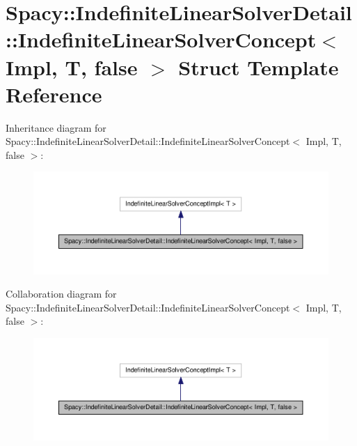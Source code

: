 \hypertarget{structSpacy_1_1IndefiniteLinearSolverDetail_1_1IndefiniteLinearSolverConcept_3_01Impl_00_01T_00_01false_01_4}{\section{\-Spacy\-:\-:\-Indefinite\-Linear\-Solver\-Detail\-:\-:\-Indefinite\-Linear\-Solver\-Concept$<$ \-Impl, \-T, false $>$ \-Struct \-Template \-Reference}
\label{structSpacy_1_1IndefiniteLinearSolverDetail_1_1IndefiniteLinearSolverConcept_3_01Impl_00_01T_00_01false_01_4}
}


\-Inheritance diagram for \-Spacy\-:\-:\-Indefinite\-Linear\-Solver\-Detail\-:\-:\-Indefinite\-Linear\-Solver\-Concept$<$ \-Impl, \-T, false $>$\-:
\nopagebreak
\begin{figure}[H]
\begin{center}
\leavevmode
\includegraphics[width=350pt]{structSpacy_1_1IndefiniteLinearSolverDetail_1_1IndefiniteLinearSolverConcept_3_01Impl_00_01T_00_01false_01_4__inherit__graph}
\end{center}
\end{figure}


\-Collaboration diagram for \-Spacy\-:\-:\-Indefinite\-Linear\-Solver\-Detail\-:\-:\-Indefinite\-Linear\-Solver\-Concept$<$ \-Impl, \-T, false $>$\-:
\nopagebreak
\begin{figure}[H]
\begin{center}
\leavevmode
\includegraphics[width=350pt]{structSpacy_1_1IndefiniteLinearSolverDetail_1_1IndefiniteLinearSolverConcept_3_01Impl_00_01T_00_01false_01_4__coll__graph}
\end{center}
\end{figure}
